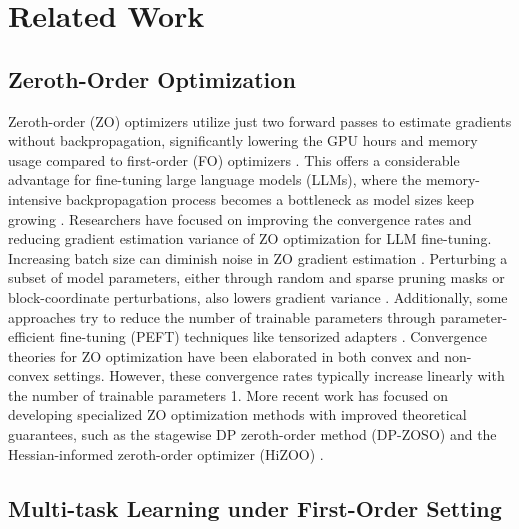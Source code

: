 \section{Related Work}

\subsection{Zeroth-Order Optimization}
Zeroth-order (ZO) optimizers utilize just two forward passes to estimate gradients without backpropagation, significantly lowering the GPU hours and memory usage compared to first-order (FO) optimizers \citep{tang2024private}. This offers a considerable advantage for fine-tuning large language models (LLMs), where the memory-intensive backpropagation process becomes a bottleneck as model sizes keep growing \citep{yang2024adazeta}.
Researchers have focused on improving the convergence rates and reducing gradient estimation variance of ZO optimization for LLM fine-tuning. Increasing batch size can diminish noise in ZO gradient estimation \citep{gautam2024variance}. Perturbing a subset of model parameters, either through random and sparse pruning masks or block-coordinate perturbations, also lowers gradient variance \citep{guo2024zeroth}. Additionally, some approaches try to reduce the number of trainable parameters through parameter-efficient fine-tuning (PEFT) techniques like tensorized adapters \citep{yang2024adazeta}.
Convergence theories for ZO optimization have been elaborated in both convex and non-convex settings. However, these convergence rates typically increase linearly with the number of trainable parameters 1. More recent work has focused on developing specialized ZO optimization methods with improved theoretical guarantees, such as the stagewise DP zeroth-order method (DP-ZOSO) \citep{liu2024differentially} and the Hessian-informed zeroth-order optimizer (HiZOO) \citep{zhao2024second}.

\subsection{Multi-task Learning under First-Order Setting}

